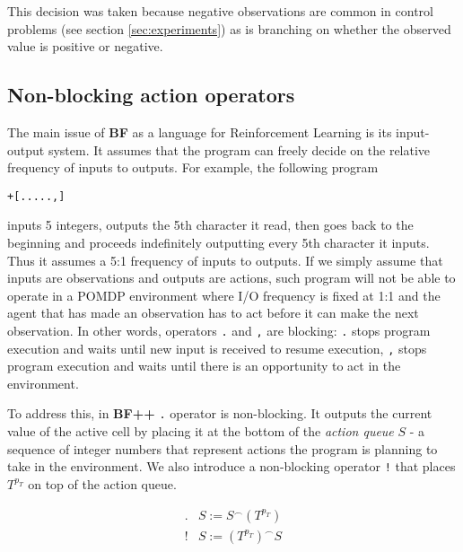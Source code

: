 This decision was taken because negative observations are common in control problems (see section \ref{sec:experiments}) as is branching on whether the observed value is positive or negative. 

\subsection{Non-blocking action operators}
\label{sec:queue}


The main issue of \textbf{BF} as a language for Reinforcement Learning is its input-output system.
It assumes that the program can freely decide on the relative frequency of inputs to outputs.
For example, the following program

\begin{center}
\begin{lstlisting}
+[.....,]
\end{lstlisting}
\end{center}

inputs 5 integers, outputs the 5th character it read, then goes back to the beginning and proceeds indefinitely outputting every 5th character it inputs.
Thus it assumes a 5:1 frequency of inputs to outputs.
If we simply assume that inputs are observations and outputs are actions, such program will not be able to operate in a POMDP environment where I/O frequency is fixed at 1:1 and the agent that has made an observation has to act before it can make the next observation.
In other words, operators \texttt{.} and \texttt{,} are blocking: \texttt{.} stops program execution and waits until new input is received to resume execution, \texttt{,} stops program execution and waits until there is an opportunity to act in the environment.

To address this, in \textbf{BF++} \texttt{.} operator is non-blocking.
It outputs the current value of the active cell by placing it at the bottom of the \textit{action queue} $S$ - a sequence of integer numbers that represent actions the program is planning to take in the environment. We also introduce a non-blocking operator \texttt{!} that places $T^{p_T}$ on top of the action queue.

\begin{equation}
    \begin{array}{cc}
         . & S := S^\frown (T^{p_T}) \\
         ! & S := (T^{p_T})^\frown S
    \end{array}
\end{equation}


